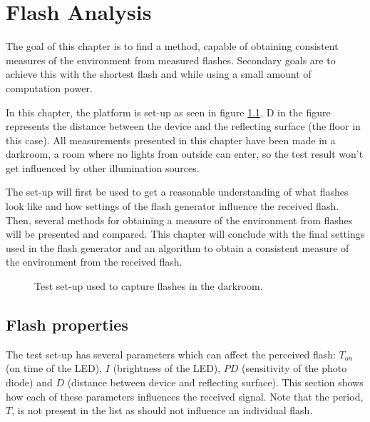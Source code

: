 \chapter{Flash Analysis}
\label{chp:Flash_Analysis}


The goal of this chapter is to find a method, capable of obtaining consistent measures of the environment from measured flashes. Secondary goals are to achieve this with the shortest flash and while using a small amount of computation power.

In this chapter, the platform is set-up as seen in figure \ref{fig:Flashcapturing}. 
D in the figure represents the distance between the device and the reflecting surface (the floor in this case). All measurements presented in this chapter have been made in a darkroom, a room where no lights from outside can enter, so the test result won't get influenced by other illumination sources.
 
The set-up will first be used to get a reasonable understanding of what flashes look like and how settings of the flash generator influence the received flash. Then, several methods for obtaining a measure of the environment from flashes will be presented and compared. This chapter will conclude with the final settings used in the flash generator and an algorithm to obtain a consistent measure of the environment from the received flash.
\begin{figure}
	\centering     %
	\caption{Test set-up used to capture flashes in the darkroom.\label{fig:Flashcapturing}}
\end{figure}

\section{Flash properties}
\label{sec:Flash_generator}
The test set-up has several parameters which can affect the perceived flash: $T_{on}$ (on time of the LED), $I$ (brightness of the LED), $PD$ (sensitivity of the photo diode) and $D$ (distance between device and reflecting surface). This section shows how each of these parameters influences the received signal. Note that the period, $T$, is not present in the list as should not influence an individual flash.

